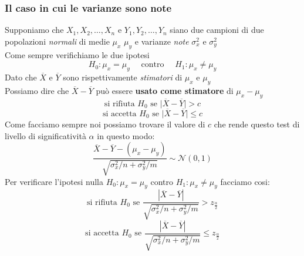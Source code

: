 \documentclass[]{article}
\begin{document}
    \subsubsection{Il caso in cui le varianze sono note}
    Supponiamo che $X_1, X_2, \ldots, X_n$ e $Y_1, Y_2, \ldots, Y_n$ siano due campioni di due popolazioni \textit{normali} di medie $\mu_x$ $\mu_y$ e varianze \textit{note} $\sigma^2_x$ e $\sigma^2_y$ \\
    Come sempre verifichiamo le due ipotesi
    \[ H_0 : \mu_x = \mu_y \quad \text{ contro } \quad H_1 : \mu_x \not = \mu_y \]
    Dato che $\overline{X}$ e $\overline{Y}$ sono rispettivamente \textit{stimatori} di $\mu_x$ e $\mu_y$ \\
    Possiamo dire che $\overline{X} - \overline{Y}$ può essere \textbf{usato come stimatore} di $\mu_x - \mu_y$
    \[ \text{si rifiuta } H_0 \text{ se } \big|\overline{X} - \overline{Y} \big| > c \]
    \[ \text{si accetta } H_0 \text{ se } \big|\overline{X} - \overline{Y} \big| \leq c \]
    Come facciamo sempre noi possiamo trovare il valore di $c$ che rende questo test di livello di significatività $\alpha$ in questo modo:
    \[ \frac{\overline{X} - \overline{Y} - (\mu_x - \mu_y)}{\sqrt{\sigma^2_x / n + \sigma^2_y / m}} \sim \mathcal{N}(0,1) \]
    Per verificare l'ipotesi nulla $H_0 : \mu_x = \mu_y$ contro $H_1 : \mu_x \not = \mu_y$ facciamo cosi:
    \[ \text{si rifiuta } H_0 \text{ se } \frac{|\overline{X} - \overline{Y}|}{\sqrt{\sigma^2_x / n + \sigma^2_y / m}} > z_{\frac{\alpha}{2}} \]
    \[ \text{si accetta } H_0 \text{ se } \frac{|\overline{X} - \overline{Y}|}{\sqrt{\sigma^2_x / n + \sigma^2_y / m}} \leq z_{\frac{\alpha}{2}} \]
\end{document}
